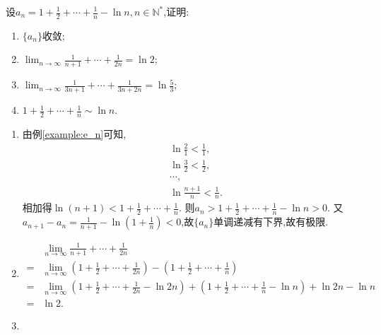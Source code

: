 \begin{example}
    设$a_n=1+\frac12 +\cdots + \frac1n -\ln n, n \in \mathbb{N}^*$,证明:
    \begin{enumerate}
        \item $\{a_n\}$收敛;
        \item $\lim_{n \to \infty} \frac{1}{n+1}+ \cdots + \frac{1}{2n}= \ln 2$;
        \item $\lim_{n \to \infty} \frac{1}{3n+1} + \cdots + \frac{1}{3n+2n} = \ln \frac 53$;
        \item $1+\frac 12 +\cdots + \frac 1n \sim \ln n$.
    \end{enumerate}

    \begin{solution}
        \begin{enumerate}
            \item 由例\ref{example:e_n}可知,
                  \begin{align*}
                       & \ln \frac21 < \frac11,       \\
                       & \ln \frac32 < \frac12,       \\
                       & \cdots,                      \\
                       & \ln \frac{n+1}{n} < \frac1n.
                  \end{align*}
                  相加得$\ln (n+1) < 1 + \frac12 + \cdots + \frac1n $. 则$a_n > 1 + \frac12 + \cdots + \frac1n - \ln n > 0$. 又$a_{n+1} - a_n = \frac{1}{n+1} - \ln \left( 1 + \frac{1}{n} \right) < 0$,故$\{a_n\}$单调递减有下界,故有极限.
            \item
                  \begin{align*}
                        & \lim_{n \to \infty} \frac{1}{n+1}+ \cdots + \frac{1}{2n}                                                                                               \\
                      = & \lim_{n \to \infty} \left( 1 + \frac12 + \cdots + \frac1{2n} \right) - \left( 1 + \frac12 + \cdots + \frac1n \right)                                   \\
                      = & \lim_{n \to \infty} \left( 1 + \frac12 + \cdots + \frac1{2n} - \ln 2n \right) + \left( 1 + \frac12 + \cdots + \frac1n - \ln n \right) + \ln 2n - \ln n \\
                      = & \ln 2.
                  \end{align*}
            \item

\end{enumerate}
\end{solution}
\end{example}

